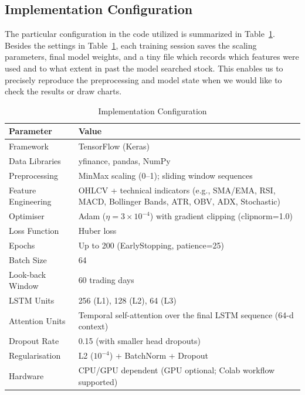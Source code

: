 \documentclass[conference]{IEEEtran}
\begin{document}
\subsection{Implementation Configuration}

The particular configuration in the code utilized is summarized in Table~\ref{tab:impl_config}. Besides the settings in Table~\ref{tab:impl_config}, each training session saves the scaling parameters, final model weights, and a tiny file which records which features were used and to what extent in past the model searched stock. This enables us to precisely reproduce the preprocessing and model state when we would like to check the results or draw charts.

\begin{table}[htbp]
\caption{Implementation Configuration}
\label{tab:impl_config}
\begin{center}
\small
\begin{tabular}{@{}p{}p{}@{}}
\toprule
\textbf{Parameter} & \textbf{Value} \\
\midrule
Framework & TensorFlow (Keras) \\
Data Libraries & yfinance, pandas, NumPy \\
Preprocessing & MinMax scaling (0--1); sliding window sequences \\
Feature Engineering & OHLCV + technical indicators (e.g., SMA/EMA, RSI, MACD, Bollinger Bands, ATR, OBV, ADX, Stochastic) \\
Optimiser & Adam ($\eta = 3\times 10^{-4}$) with gradient clipping (clipnorm=1.0) \\
Loss Function & Huber loss \\
Epochs & Up to 200 (EarlyStopping, patience=25) \\
Batch Size & 64 \\
Look-back Window & 60 trading days \\
LSTM Units & 256 (L1), 128 (L2), 64 (L3) \\
Attention Units & Temporal self-attention over the final LSTM sequence (64-d context) \\
Dropout Rate & 0.15 (with smaller head dropouts) \\
Regularisation & L2 ($10^{-4}$) + BatchNorm + Dropout \\
Hardware & CPU/GPU dependent (GPU optional; Colab workflow supported) \\
\bottomrule
\end{tabular}
\end{center}
\end{table}
\end{document}
